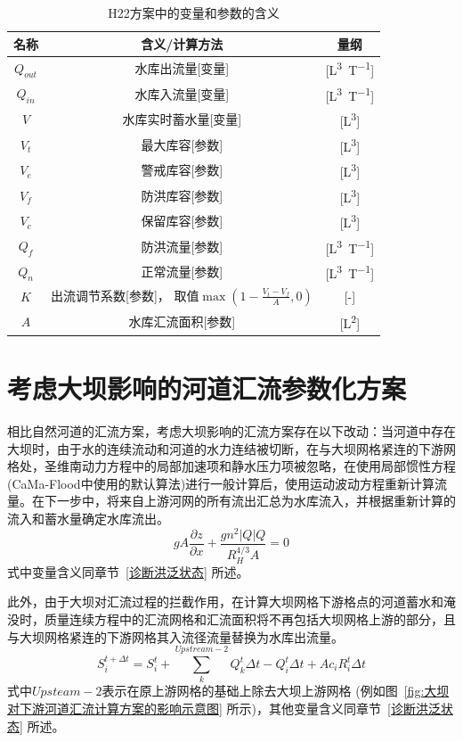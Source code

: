 \begin{table}[htbp]
    \centering
    \caption{H22方案中的变量和参数的含义}
    \label{tab:H22方案变量参数表}
    \begin{tabular}{ccc}
    \toprule
    名称 & 含义/计算方法 & 量纲 \\ \midrule
    $Q_{out}$  & 水库出流量[变量]  & [\unit{L^3.T^{-1}}]  \\
    $Q_{in}$ & 水库入流量[变量] & [\unit{L^3.T^{-1}}] \\
    $V$ & 水库实时蓄水量[变量] & [\unit{L^3}] \\
    $V_{t}$  &  最大库容[参数] & [\unit{L^3}] \\
    $V_{e}$ & 警戒库容[参数]  &[\unit{L^3}] \\
    $V_{f}$  & 防洪库容[参数] & [\unit{L^3}]  \\
    $V_{c}$  & 保留库容[参数] & [\unit{L^3}]  \\
    $Q_{f}$ & 防洪流量[参数] & [\unit{L^3.T^{-1}}]  \\
    $Q_{n}$ & 正常流量[参数] & [\unit{L^3.T^{-1}}]  \\
    $K$ & \makecell{出流调节系数[参数]，\\取值$\max\left(1-\frac{V_{t}-V_{f}}{A},0\right)$} & [-] \\
    $A$ & 水库汇流面积[参数] & [\unit{L^2}] \\
    \bottomrule
    \end{tabular}
\end{table}

\section{考虑大坝影响的河道汇流参数化方案}
相比自然河道的汇流方案，考虑大坝影响的汇流方案存在以下改动：当河道中存在大坝时，由于水的连续流动和河道的水力连结被切断，在与大坝网格紧连的下游网格处，圣维南动力方程中的局部加速项和静水压力项被忽略，在使用局部惯性方程(CaMa-Flood中使用的默认算法)进行一般计算后，使用运动波动方程重新计算流量。在下一步中，将来自上游河网的所有流出汇总为水库流入，并根据重新计算的流入和蓄水量确定水库流出。
\begin{equation}
g A \frac{\partial z}{\partial x}+\frac{g n^{2}|Q| Q}{R_{H}^{4 / 3} A}=0
\end{equation}
式中变量含义同章节~\ref{诊断洪泛状态} 所述。


此外，由于大坝对汇流过程的拦截作用，在计算大坝网格下游格点的河道蓄水和淹没时，质量连续方程中的汇流网格和汇流面积将不再包括大坝网格上游的部分，且与大坝网格紧连的下游网格其入流径流量替换为水库出流量。
\begin{equation}
S_{i}^{t+\Delta t}=S_{i}^{t}+\sum_{k}^{Upstream-2} Q_{k}^{t} \Delta t-Q_{i}^{t} \Delta t+A c_{i} R_{i}^{t} \Delta t
\end{equation}
式中$Upsteam-2$表示在原上游网格的基础上除去大坝上游网格 (例如图~\ref{fig:大坝对下游河道汇流计算方案的影响示意图} 所示)，其他变量含义同章节~\ref{诊断洪泛状态} 所述。


